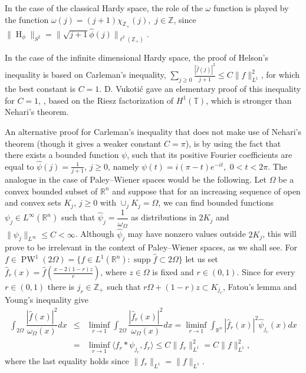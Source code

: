 \documentclass[footinclude=true]{amsart}
\theoremstyle{plain}
\DeclareMathOperator{\Ha}{H}
\DeclareMathOperator{\PW}{PW}
\DeclareMathOperator{\supp}{supp}
\begin{document}
	In the case of the classical Hardy space, the role of the $\omega$ function is played by the function $\omega(j)=(j+1)\chi_{\mathbb{Z}_{+}}(j),$ $j\in\mathbb{Z}$, since $\|\Ha_{\phi}\|_{S^{2}}=\|\sqrt{j+1}\widehat{\phi}(j)\|_{\ell^{2}(\mathbb{Z}_{+})}.$ 
	\par In the case of the infinite dimensional Hardy space, the proof of Helson's inequality is based on Carleman's inequality, $\sum_{j\geq 0}\frac{|\widehat{f}(j)|^2}{j+1}\leq C\|f\|_{L^{1}}^2$, for which the best constant is $C=1$. D. Vukoti\'{c} gave an elementary proof of this inequality for $C=1$, \cite{MR1984405}, based on the Riesz factorization of $H^1(\mathbb{T})$, which is stronger than Nehari's theorem. 
	\par An alternative proof for Carleman's inequality that does not make use of Nehari's theorem (though it gives a weaker constant $C=\pi$), is by using the fact that there exists a bounded function $\psi$, such that its positive Fourier coefficients are equal to $\widehat{\psi}(j)=\frac{1}{j+1}$, $j\geq 0$, namely $\psi(t)=i(\pi-t)e^{-it},$ $0<t<2\pi$. The analogue in the case of Paley--Wiener spaces would be the following. Let $\Omega$ be a convex bounded subset of $\mathbb{R}^n$ and suppose that for an increasing sequence of open and convex sets $K_{j}$, $j\geq 0$ with $\cup_{j}K_{j}=\Omega$, we can find bounded functions $\psi_{j}\in L^{\infty}(\mathbb{R}^{n})$ such that $\widehat{\psi}_j=\dfrac{1}{\omega_{\Omega}}$ as distributions in $2K_{j}$ and $\|\psi_{j}\|_{L^{\infty}}\leq C<\infty$. Although  $\widehat{\psi}_j$  may have nonzero values outside $2K_j$, this will prove to be irrelevant in the context of Paley--Wiener spaces, as we shall see. For $f\in \PW^1(2\Omega)=\{f\in L^{1}(\mathbb{R}^{n}):\supp\widehat{f}\subset 2\Omega\}$ let us set $\widehat{f}_r(x)=\widehat{f}(\frac{x-2(1-r)z}{r})$, where $z\in \Omega$ is fixed and $r\in (0,1)$. Since for every $r\in (0,1)$ there is $j_r\in\mathbb{Z}_{+}$ such that $r\Omega+(1-r)z\subset K_{j_r}$, Fatou's lemma and Young's inequality give
	\begin{eqnarray}
		\int_{2\Omega}\dfrac{|\widehat{f}(x)|^{2}}{\omega_{\Omega}(x)}dx&\leq& \liminf_{r\to 1}\int_{2\Omega}\dfrac{|\widehat{f}_r(x)|^{2}}{\omega_{\Omega}(x)}dx=\liminf_{r\to 1}\int_{\mathbb{R}^{n}}|\widehat{f}_r(x)|^{2}\widehat{\psi}_{j_r}(x)dx \nonumber \\
		&=&\liminf_{r\to 1}\langle f_r\ast\psi_{j_r},f_r\rangle\leq C\|f_r\|_{L^{1}}^2=C\|f\|_{L^{1}}^2, \nonumber 
	\end{eqnarray}
where the last equality holds since $\|f_r\|_{L^1}=\|f\|_{L^1}$.
\end{document}
